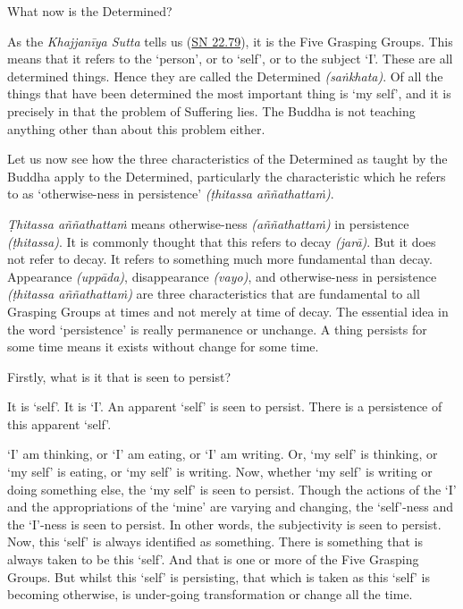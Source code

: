 What now is the Determined?

As the \emph{Khajjanīya Sutta} tells us (\href{https://suttacentral.net/sn22.79/en/bodhi}{SN 22.79}), it is the Five Grasping Groups. This means that it refers to the `person', or to `self', or to the subject `I'. These are all determined things. Hence they are called the Determined \emph{(saṅkhata)}. Of all the things that have been determined the most important thing is `my self', and it is precisely in  that the problem of Suffering lies. The Buddha is not teaching anything other than about this problem either.

Let us now see how the three characteristics of the Determined as taught by the Buddha apply to the Determined, particularly the characteristic which he refers to as `otherwise-ness in persistence' \emph{(ṭhitassa aññathattaṁ)}.

\emph{Ṭhitassa aññathattaṁ} means otherwise-ness \emph{(aññathattaṁ)} in persistence \emph{(ṭhitassa)}. It is commonly thought that this refers to decay \emph{(jarā)}. But it does not refer to decay. It refers to something much more fundamental than decay. Appearance \emph{(uppāda)}, disappearance \emph{(vayo)}, and otherwise-ness in persistence \emph{(ṭhitassa aññathattaṁ)} are three characteristics that are fundamental to all Grasping Groups at  times and not merely at time of decay. The essential idea in the word `persistence' is really permanence or unchange. A thing persists for some time means it exists without change for some time.

Firstly, what is it that is seen to persist?

It is `self'. It is `I'. An apparent `self' is seen to persist. There is a persistence of this apparent `self'.

`I' am thinking, or `I' am eating, or `I' am writing. Or, `my self' is thinking, or `my self' is eating, or `my self' is writing. Now, whether `my self' is writing or doing something else, the `my self' is seen to persist. Though the actions of the `I' and the appropriations of the `mine' are varying and changing, the `self'-ness and the `I'-ness is seen to persist. In other words, the subjectivity is seen to persist. Now, this `self' is always identified as something. There is something that is always taken to be this `self'. And that is one or more of the Five Grasping Groups. But whilst this `self' is persisting, that which is taken as this `self' is becoming otherwise, is under-going transformation or change all the time.

